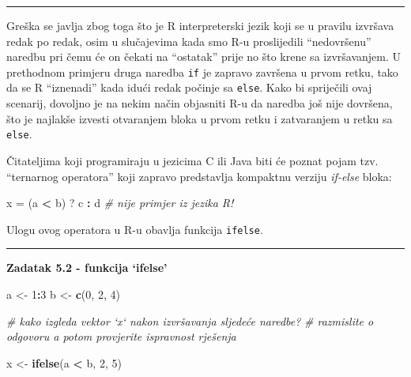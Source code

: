\documentclass[]{book}
\newenvironment{Shaded}{\begin{snugshade}}{\end{snugshade}}
\newcommand{\KeywordTok}[1]{\textcolor[rgb]{0.13,0.29,0.53}{\textbf{#1}}}
\newcommand{\DecValTok}[1]{\textcolor[rgb]{0.00,0.00,0.81}{#1}}
\newcommand{\StringTok}[1]{\textcolor[rgb]{0.31,0.60,0.02}{#1}}
\newcommand{\CommentTok}[1]{\textcolor[rgb]{0.56,0.35,0.01}{\textit{#1}}}
\newcommand{\OperatorTok}[1]{\textcolor[rgb]{0.81,0.36,0.00}{\textbf{#1}}}
\newcommand{\NormalTok}[1]{#1}
\theoremstyle{definition}
\theoremstyle{definition}
\theoremstyle{definition}
\theoremstyle{remark}
\begin{document}
\begin{center}\rule{0.5\linewidth}{\linethickness}\end{center}

Greška se javlja zbog toga što je R interpreterski jezik koji se u
pravilu izvršava redak po redak, osim u slučajevima kada smo R-u
proslijedili ``nedovršenu'' naredbu pri čemu će on čekati na ``ostatak''
prije no što krene sa izvršavanjem. U prethodnom primjeru druga naredba
\texttt{if} je zapravo završena u prvom retku, tako da se R ``iznenadi''
kada idući redak počinje sa \texttt{else}. Kako bi spriječili ovaj
scenarij, dovoljno je na nekim način objasniti R-u da naredba još nije
dovršena, što je najlakše izvesti otvaranjem bloka u prvom retku i
zatvaranjem u retku sa \texttt{else}.

Čitateljima koji programiraju u jezicima C ili Java biti će poznat pojam
tzv. ``ternarnog operatora'' koji zapravo predstavlja kompaktnu verziju
\emph{if-else} bloka:

\begin{Shaded}
\begin{Highlighting}[]
\NormalTok{x =}\StringTok{ }\NormalTok{(a }\OperatorTok{<}\StringTok{ }\NormalTok{b) ? c }\OperatorTok{:}\StringTok{ }\NormalTok{d       }\CommentTok{# nije primjer iz jezika R!}
\end{Highlighting}
\end{Shaded}

Ulogu ovog operatora u R-u obavlja funkcija \texttt{ifelse}.

\begin{center}\rule{0.5\linewidth}{\linethickness}\end{center}

\textbf{Zadatak 5.2 - funkcija `ifelse'}

\begin{Shaded}
\begin{Highlighting}[]
\NormalTok{a <-}\StringTok{ }\DecValTok{1}\OperatorTok{:}\DecValTok{3}
\NormalTok{b <-}\StringTok{ }\KeywordTok{c}\NormalTok{(}\DecValTok{0}\NormalTok{, }\DecValTok{2}\NormalTok{, }\DecValTok{4}\NormalTok{)}

\CommentTok{# kako izgleda vektor `x` nakon izvršavanja sljedeće naredbe?}
\CommentTok{# razmislite o odgovoru a potom provjerite ispravnost rješenja}

\NormalTok{x <-}\StringTok{ }\KeywordTok{ifelse}\NormalTok{(a }\OperatorTok{<}\StringTok{ }\NormalTok{b, }\DecValTok{2}\NormalTok{, }\DecValTok{5}\NormalTok{)}
\end{Highlighting}
\end{Shaded}
\end{document}
